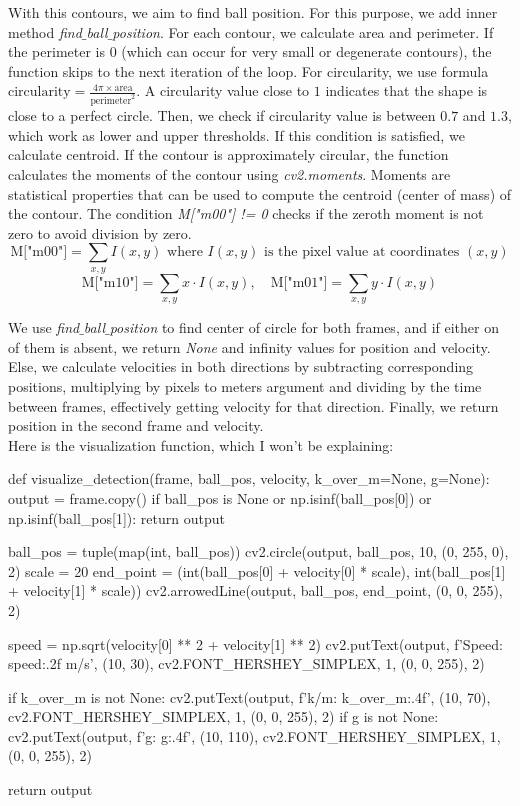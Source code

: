 \documentclass{article}
\begin{document}
	With this contours, we aim to find ball position. For this purpose, we add inner method \textit{find$\_$ball$\_$position}. For each contour, we calculate area and perimeter. If the perimeter is $0$ (which can occur for very small or degenerate contours), the function skips to the next iteration of the loop. For circularity, we use formula $\text{circularity} = \frac{4 \pi \times \text{area}}{\text{perimeter}^2}$. A circularity value close to $1$ indicates that the shape is close to a perfect circle. Then, we check if circularity value is between $0.7$ and $1.3$, which work as lower and upper thresholds. If this condition is satisfied, we calculate centroid. If the contour is approximately circular, the function calculates the moments of the contour using \textit{cv2.moments}. Moments are statistical properties that can be used to compute the centroid (center of mass) of the contour. The condition \textit{M["m00"] != 0} checks if the zeroth moment is not zero to avoid division by zero. $$\text{M["m00"]} = \sum_{x, y} I(x, y) \text{ where } I(x, y) \text{ is the pixel value at coordinates } (x, y)$$ $$\text{M["m10"]} = \sum_{x,y} x \cdot I(x, y), \quad \text{M["m01"]} = \sum_{x,y} y \cdot I(x, y)$$
	
	We use \textit{find$\_$ball$\_$position} to find center of circle for both frames, and if either on of them is absent, we return \textit{None} and infinity values for position and velocity. Else, we calculate velocities in both directions by subtracting corresponding positions, multiplying by pixels to meters argument and dividing by the time between frames, effectively getting velocity for that direction. Finally, we return position in the second frame and velocity. \\
	
	Here is the visualization function, which I won't be explaining: \\
	
\begin{python}
def visualize_detection(frame, ball_pos, velocity, k_over_m=None, g=None):
	output = frame.copy()
	if ball_pos is None or np.isinf(ball_pos[0]) or np.isinf(ball_pos[1]):
		return output

	ball_pos = tuple(map(int, ball_pos))
	cv2.circle(output, ball_pos, 10, (0, 255, 0), 2)
	scale = 20
	end_point = (int(ball_pos[0] + velocity[0] * scale), int(ball_pos[1] + velocity[1] * scale))
	cv2.arrowedLine(output, ball_pos, end_point, (0, 0, 255), 2)

	speed = np.sqrt(velocity[0] ** 2 + velocity[1] ** 2)
	cv2.putText(output, f'Speed: {speed:.2f} m/s', (10, 30), cv2.FONT_HERSHEY_SIMPLEX, 1, (0, 0, 255), 2)

	if k_over_m is not None:
		cv2.putText(output, f'k/m: {k_over_m:.4f}', (10, 70), cv2.FONT_HERSHEY_SIMPLEX, 1, (0, 0, 255), 2)
	if g is not None:
		cv2.putText(output, f'g: {g:.4f}', (10, 110), cv2.FONT_HERSHEY_SIMPLEX, 1, (0, 0, 255), 2)

	return output
\end{python}
\end{document}
